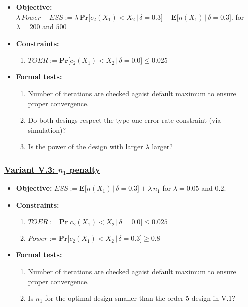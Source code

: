 \documentclass[]{book}
\providecommand{\tightlist}{%
  \setlength{\itemsep}{0pt}\setlength{\parskip}{0pt}}
\begin{document}
\begin{itemize}
\tightlist
\item
  \textbf{Objective:} \(\lambda\, Power - ESS := \lambda\, \boldsymbol{Pr}\big[c_2(X_1) < X_2\,|\,\delta=0.3\big] - \boldsymbol{E}\big[n(X_1)\,|\,\delta=0.3\big].\)
  for \(\lambda = 200\) and \(500\)
\item
  \textbf{Constraints:}

  \begin{enumerate}
  \def\labelenumi{\arabic{enumi}.}
  \tightlist
  \item
    \(TOER := \boldsymbol{Pr}\big[c_2(X_1) < X_2\,|\,\delta=0.0\big] \leq 0.025\)
  \end{enumerate}
\item
  \textbf{Formal tests:}

  \begin{enumerate}
  \def\labelenumi{\arabic{enumi}.}
  \tightlist
  \item
    Number of iterations are checked agaist default maximum to ensure proper
    convergence.
  \item
    Do both desings respect the type one error rate constraint (via simulation)?
  \item
    Is the power of the design with larger \(\lambda\) larger?
  \end{enumerate}
\end{itemize}

\hypertarget{variant-v.3-n_1-penalty}{%
\subsubsection{\texorpdfstring{\protect\hyperlink{variantV_3}{Variant V.3: \(n_1\) penalty}}{Variant V.3: n\_1 penalty}}\label{variant-v.3-n_1-penalty}}

\begin{itemize}
\tightlist
\item
  \textbf{Objective:} \(ESS := \boldsymbol{E}\big[n(X_1)\,|\,\delta=0.3\big] + \lambda \, n_1\)
  for \(\lambda = 0.05\) and \(0.2\).
\item
  \textbf{Constraints:}

  \begin{enumerate}
  \def\labelenumi{\arabic{enumi}.}
  \tightlist
  \item
    \(TOER := \boldsymbol{Pr}\big[c_2(X_1) < X_2\,|\,\delta=0.0\big] \leq 0.025\)
  \item
    \(Power := \boldsymbol{Pr}\big[c_2(X_1) < X_2\,|\,\delta=0.3\big] \geq 0.8\)
  \end{enumerate}
\item
  \textbf{Formal tests:}

  \begin{enumerate}
  \def\labelenumi{\arabic{enumi}.}
  \tightlist
  \item
    Number of iterations are checked agaist default maximum to ensure proper
    convergence.
  \item
    Is \(n_1\) for the optimal design smaller than the order-5 design in V.1?
  \end{enumerate}
\end{itemize}
\end{document}
